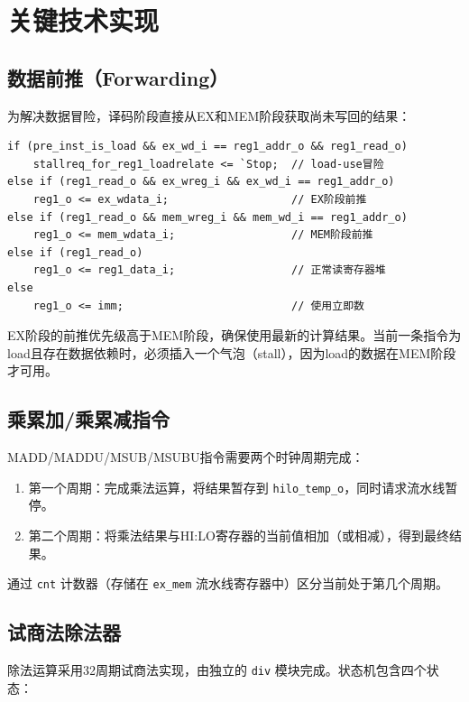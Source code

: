 \section{关键技术实现}

\subsection{数据前推（Forwarding）}

为解决数据冒险，译码阶段直接从EX和MEM阶段获取尚未写回的结果：

\begin{lstlisting}[caption={数据前推逻辑（以源操作数1为例）}]
if (pre_inst_is_load && ex_wd_i == reg1_addr_o && reg1_read_o)
    stallreq_for_reg1_loadrelate <= `Stop;  // load-use冒险
else if (reg1_read_o && ex_wreg_i && ex_wd_i == reg1_addr_o)
    reg1_o <= ex_wdata_i;                   // EX阶段前推
else if (reg1_read_o && mem_wreg_i && mem_wd_i == reg1_addr_o)
    reg1_o <= mem_wdata_i;                  // MEM阶段前推
else if (reg1_read_o)
    reg1_o <= reg1_data_i;                  // 正常读寄存器堆
else
    reg1_o <= imm;                          // 使用立即数
\end{lstlisting}

EX阶段的前推优先级高于MEM阶段，确保使用最新的计算结果。当前一条指令为load且存在数据依赖时，必须插入一个气泡（stall），因为load的数据在MEM阶段才可用。

\subsection{乘累加/乘累减指令}

MADD/MADDU/MSUB/MSUBU指令需要两个时钟周期完成：

\begin{enumerate}[leftmargin=2em]
    \item 第一个周期：完成乘法运算，将结果暂存到 \texttt{hilo\_temp\_o}，同时请求流水线暂停。
    \item 第二个周期：将乘法结果与HI:LO寄存器的当前值相加（或相减），得到最终结果。
\end{enumerate}

通过 \texttt{cnt} 计数器（存储在 \texttt{ex\_mem} 流水线寄存器中）区分当前处于第几个周期。

\subsection{试商法除法器}

除法运算采用32周期试商法实现，由独立的 \texttt{div} 模块完成。状态机包含四个状态：


